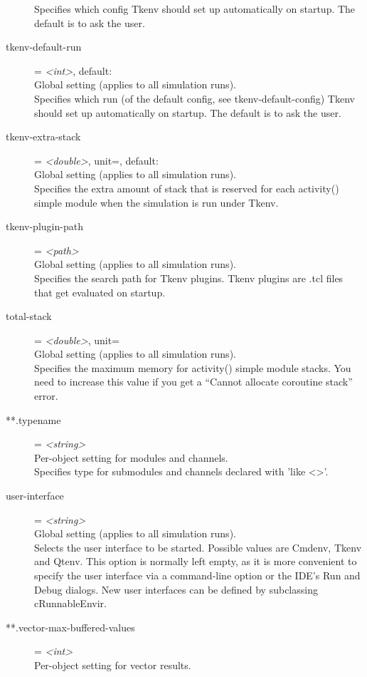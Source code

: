 \begin{description}
    Specifies which config Tkenv should set up automatically on startup. The
    default is to ask the user.
\item[tkenv-default-run] = \textit{<int>}, default: \\
    Global setting (applies to all simulation runs).\\
    Specifies which run (of the default config, see tkenv-default-config) Tkenv
    should set up automatically on startup. The default is to ask the user.
\item[tkenv-extra-stack] = \textit{<double>}, unit=, default: \\
    Global setting (applies to all simulation runs).\\
    Specifies the extra amount of stack that is reserved for each activity()
    simple module when the simulation is run under Tkenv.
\item[tkenv-plugin-path] = \textit{<path>}\\
    Global setting (applies to all simulation runs).\\
    Specifies the search path for Tkenv plugins. Tkenv plugins are .tcl files
    that get evaluated on startup.
\item[total-stack] = \textit{<double>}, unit=\\
    Global setting (applies to all simulation runs).\\
    Specifies the maximum memory for activity() simple module stacks. You need
    to increase this value if you get a ``Cannot allocate coroutine stack''
    error.
\item[**.typename] = \textit{<string>}\\
    Per-object setting for modules and channels.\\
    Specifies type for submodules and channels declared with 'like <>'.
\item[user-interface] = \textit{<string>}\\
    Global setting (applies to all simulation runs).\\
    Selects the user interface to be started. Possible values are Cmdenv, Tkenv
    and Qtenv. This option is normally left empty, as it is more convenient to
    specify the user interface via a command-line option or the IDE's Run and
    Debug dialogs. New user interfaces can be defined by subclassing
    cRunnableEnvir.
\item[**.vector-max-buffered-values] = \textit{<int>}\\
    Per-object setting for vector results.\\

\end{description}
